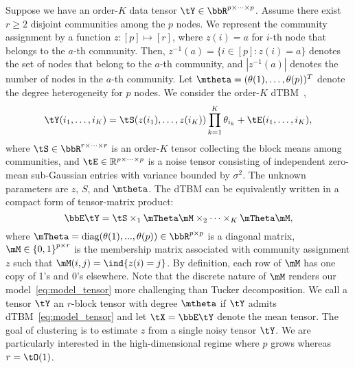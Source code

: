 \documentclass[lettersize,onecolumn,journal]{IEEEtran}
\theoremstyle{definition}
\theoremstyle{definition}
\newcommand{\offf}[1]{\left\{#1\right\}}
\begin{document}
Suppose we have an order-$K$ data tensor $\tY \in \bbR^{p \times \cdots \times p}$. %
Assume there exist $r \geq 2$  disjoint communities among the $p$ nodes. We represent the community assignment by a function $z \colon [p]\mapsto[r]$, where $z(i) = a$ for $i$-th node that belongs to the $a$-th community. Then, $z^{-1}(a)=\{i\in[p]\colon z(i)=a\}$ denotes the set of nodes that belong to the $a$-th community, and $|z^{-1}(a)|$ denotes the number of nodes in the $a$-th community. Let $\mtheta=(\theta(1),\ldots,\theta(p))^T$ denote the degree heterogeneity for $p$ nodes. We consider the order-$K$ dTBM~\citep{ghoshdastidar2017consistency,ke2019community},
\begin{equation}\label{eq:model_margin}
    \tY(i_1,\ldots,i_K) = \tS(z(i_1),\ldots,z(i_K)) \prod_{k = 1}^K\theta_{i_k} + \tE(i_1,\ldots,i_K), 
\end{equation}
\normalsize
where $\tS \in \bbR^{r \times \cdots \times r}$ is an order-$K$ tensor collecting the block means among communities, and %
$\tE\in\mathbb{R}^{p\times \cdots \times p}$ is a noise tensor consisting of independent zero-mean sub-Gaussian entries with variance bounded by $\sigma^2$. 
The unknown parameters are $z$, $S$, and $\mtheta$. The dTBM can be equivalently written in a compact form of tensor-matrix product:
\begin{equation}\label{eq:model_tensor}
\bbE\tY = \tS \times_1 \mTheta \mM \times_2 \cdots \times_K  \mTheta \mM,
\end{equation}
where $\mTheta = \text{diag}(\theta(1),...,\theta(p)) \in \bbR^{p \times p}$ is a diagonal matrix, $\mM \in \offf{0,1}^{p \times r}$ is the membership matrix associated with community assignment $z$ such that $\mM(i,j)=\ind\{z(i)=j\}$. By definition, each row of $\mM$ has one copy of 1's and 0's elsewhere. Note that the discrete nature of $\mM$ renders our model~\eqref{eq:model_tensor} more challenging than Tucker decomposition. We call a tensor $\tY$ an $r$-block tensor with degree $\mtheta$ if $\tY$ admits dTBM~\eqref{eq:model_tensor}   {and let $\tX = \bbE \tY$ denote the mean tensor.} The goal of clustering is to estimate $z$ from a single noisy tensor $\tY$. We are particularly interested in the high-dimensional regime where $p$ grows whereas $r=\tO(1)$. 
\end{document}
